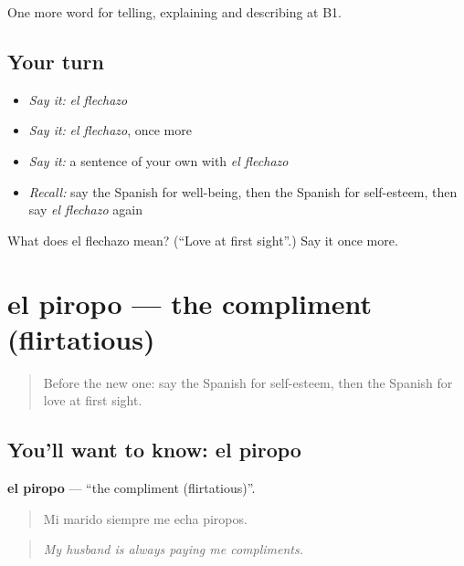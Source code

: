 \begin{grammarlens}[title={What you've built}]
One more word for telling, explaining and describing at B1.
\end{grammarlens}

\subsection*{Your turn}
\begin{itemize}
\raggedright
  \item \emph{Say it:} \emph{el flechazo}
  \item \emph{Say it:} \emph{el flechazo}, once more
  \item \emph{Say it:} a sentence of your own with \emph{el flechazo}
  \item \emph{Recall:} say the Spanish for well-being, then the Spanish for self-esteem, then say \emph{el flechazo} again
\end{itemize}

\begin{tcolorbox}[breakable,colback=teal!4,colframe=teal!35!black,title={Before you move on}]
What does el flechazo mean? (\textquotedblleft{}Love at first sight\textquotedblright{}.) Say it once more.
\end{tcolorbox}
\section[el piropo]{el piropo — the compliment (flirtatious)}

\label{lesson:ES-C744-piropo}



\begin{quote}
Before the new one: say the Spanish for self-esteem, then the Spanish for love at first sight.
\end{quote}

\subsection*{You'll want to know: el piropo}
\textbf{el piropo} — \textquotedblleft{}the compliment (flirtatious)\textquotedblright{}.

\begin{quote}
Mi marido siempre me echa piropos.
\end{quote}

\begin{quote}
\emph{My husband is always paying me compliments.}
\end{quote}


